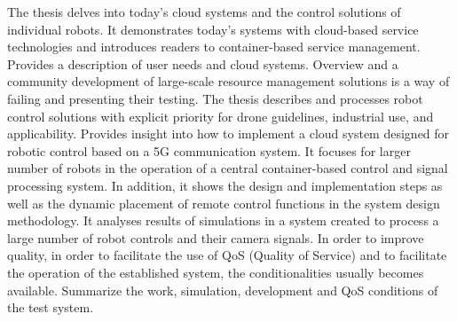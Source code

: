 The thesis delves into today’s cloud systems and the control solutions of individual robots.
It demonstrates today’s systems with cloud-based service technologies and introduces readers to container-based service management. Provides a description of user needs and cloud systems. Overview and a community development of large-scale resource management solutions is a way of failing and presenting their testing. The thesis describes and processes robot control solutions with explicit priority for drone guidelines, industrial use, and applicability. Provides insight into how to implement a cloud system designed for robotic control based on a 5G communication system. It focuses for larger number of robots in the operation of a central container-based control and signal processing system. In addition, it shows the design and implementation steps as well as the dynamic placement of remote control functions in the system design methodology. It analyses results of simulations in a system created to process a large number of robot controls and their camera signals. In order to improve quality, in order to facilitate the use of QoS (Quality of Service) and to facilitate the operation of the established system, the conditionalities usually becomes available.
Summarize the work, simulation, development and QoS conditions of the test system.

\vfill
\selectthesislanguage

\setcounter{romanPage}{\value{page}}
